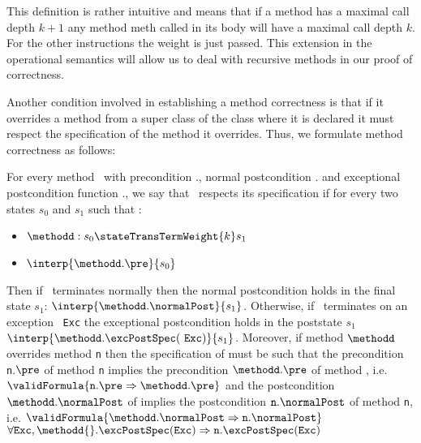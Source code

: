 This definition is rather intuitive and means that if a method \methodd{}
 has a maximal call depth $k+1$ any method \mbox{\rm meth}  called in its body will have a maximal call depth $k$. For the other instructions the 
weight is just passed. This extension in the operational semantics will allow us to deal with recursive methods in our proof of correctness.


 
 Another condition involved in establishing a method correctness is that if it overrides a method from a super class
 of the class where it is declared  it must respect the specification of the method it overrides. Thus, we formulate method correctness as follows:

\begin{defCorrect} \label{defCorrect}
For every method \methodd \ with precondition \methodd.\pre, normal postcondition \methodd.\normalPost
and exceptional postcondition function \methodd.\excPostSpec, we say that \methodd \ respects its specification if 
for every two states $s_0$ and $s_1$ such that :
\begin{itemize}
      
      \item   $\methodd : s_0  \stateTransTermWeight{k} s_1   $
      \item   $ \interp{\methodd.\pre }{ s_0 }$
\end{itemize}
Then if \methodd \ terminates normally then the normal postcondition holds in the final state $s_1 $:  $\interp{\methodd.\normalPost}{s_1}$. 
Otherwise, if  \methodd \ terminates on an exception \mbox{ \rm \texttt{Exc}} the exceptional postcondition holds in the poststate $s_1 $
$ \interp{\methodd.\excPostSpec(  \mbox{ \rm \texttt{Exc}} )}{s_1} $.
 Moreover, if method $\methodd$ overrides method \mbox{\rm\texttt{n}} then the specification of \methodd{} must be such that
 the precondition \mbox{\rm\texttt{n}}.$\pre$ of method  \mbox{\rm\texttt{n}} implies the precondition  $\methodd.\pre$ of method \methodd{}, i.e.
$\validFormula{\mbox{\rm\texttt{n}}.\pre \Rightarrow   \methodd.\pre}$  
and the postcondition 
$\methodd.\normalPost$ of \methodd{} implies the postcondition $\mbox{\rm\texttt{n}}.\normalPost$   of method \mbox{\rm\texttt{n}}, i.e. 
$\validFormula{\methodd.\normalPost \Rightarrow \mbox{\rm\texttt{n}}.\normalPost } $
 $\forall \mbox{\rm\texttt{Exc}} , \methodd{}.\excPostSpec(\mbox{\rm\texttt{Exc}}  )    \Rightarrow \mbox{\rm\texttt{n}}.\excPostSpec(\mbox{\rm\texttt{Exc}}  )$
\end{defCorrect}

